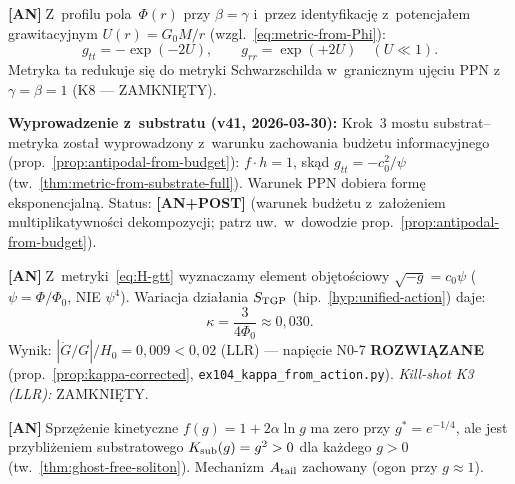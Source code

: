 \begin{chain}\label{chain:A11}
  \textbf{[AN]}$\;$Z~profilu pola~$\Phi(r)$ przy $\beta = \gamma$
  i~przez identyfikacj\k{e} z~potencja\l{}em grawitacyjnym
  $U(r) = G_0 M / r$ (wzgl.~\eqref{eq:metric-from-Phi}):
  \begin{equation}\label{eq:H-gtt}
    g_{tt} = -\exp(-2U),\qquad
    g_{rr} = \exp(+2U)
    \quad (U \ll 1).
  \end{equation}
  Metryka ta redukuje si\k{e} do metryki Schwarzschilda
  w~granicznym uj\k{e}ciu PPN z~$\gamma = \beta = 1$
  (K8 --- ZAMKNI\k{E}TY).

  \medskip\noindent\textbf{Wyprowadzenie z~substratu (v41, 2026-03-30):}
  Krok~3 mostu substrat--metryka zosta\l{} wyprowadzony
  z~warunku zachowania bud\.zetu informacyjnego
  (prop.~\ref{prop:antipodal-from-budget}):
  $f \cdot h = 1$, sk\k{a}d $g_{tt} = -c_0^2/\psi$
  (tw.~\ref{thm:metric-from-substrate-full}).
  Warunek PPN dobiera form\k{e} eksponencjaln\k{a}.
  Status: \textbf{[AN+POST]} (warunek bud\.zetu z~za\l{}o\.zeniem
  multiplikatywno\'sci dekompozycji; patrz uw.\ w~dowodzie
  prop.~\ref{prop:antipodal-from-budget}).
\end{chain}

\begin{chain}[A11b --- Zunifikowana akcja $S_{\rm TGP}$
  i~$\kappa = 3/(4\Phi_0)$]\label{chain:A11b}
  \textbf{[AN]}$\;$Z~metryki~\eqref{eq:H-gtt}
  wyznaczamy element obj\k{e}to\'sciowy $\sqrt{-g} = c_0\psi$
  ($\psi = \Phi/\Phi_0$, NIE $\psi^4$).
  Wariacja dzia\l{}ania $S_{\rm TGP}$
  (hip.~\ref{hyp:unified-action}) daje:
  \begin{equation}
    \kappa = \frac{3}{4\Phi_0} \approx 0{,}030.
  \end{equation}
  Wynik: $|\dot G/G|/H_0 = 0{,}009 < 0{,}02$ (LLR) ---
  napi\k{e}cie N0-7 \textbf{ROZWI\k{A}ZANE}
  (prop.~\ref{prop:kappa-corrected},
  \texttt{ex104\_kappa\_from\_action.py}).
  \emph{Kill-shot K3 (LLR):} ZAMKNI\k{E}TY.
\end{chain}

\begin{chain}%
\label{chain:A11c}
  \textbf{[AN]}$\;$Sprzężenie kinetyczne $f(g) = 1 + 2\alpha\ln g$
  ma zero przy $g^* = e^{-1/4}$, ale jest przybli\.zeniem
  substratowego $K_{\rm sub}(g) = g^2 > 0$ dla ka\.zdego $g > 0$
  (tw.~\ref{thm:ghost-free-soliton}).
  Mechanizm $A_{\rm tail}$ zachowany (ogon przy $g \approx 1$).
\end{chain}

